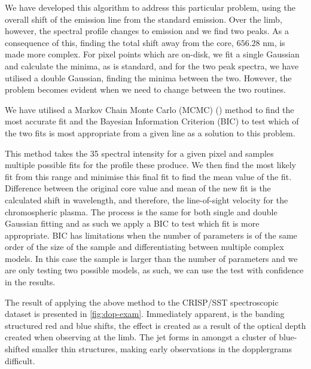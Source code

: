 We have developed this algorithm to address this particular problem, using the overall shift of the emission line from the standard emission. 
Over the limb, however, the spectral profile changes to emission and we find two peaks.
As a consequence of this, finding the total shift away from the core, $656.28$ nm, is made more complex.
For pixel points which are on-disk, we fit a single Gaussian and calculate the minima, as is standard, and for the two peak spectra, we have utilised a double Gaussian, finding the minima between the two.
However, the problem becomes evident when we need to change between the two routines.

We have utilised a Markov Chain Monte Carlo (MCMC) (\cite{Richey2010}) method to find the most accurate fit and the Bayesian Information Criterion (BIC) to test which of the two fits is most appropriate from a given line as a solution to this problem.

This method takes the 35 spectral intensity for a given pixel and samples multiple possible fits for the profile these produce.
We then find the most likely fit from this range and minimise this final fit to find the mean value of the fit.
Difference between the original core value and mean of the new fit is the calculated shift in wavelength, and therefore, the line-of-sight velocity for the chromospheric plasma.
The process is the same for both single and double Gaussian fitting and as such we apply a BIC to test which fit is more appropriate.
BIC has limitations when the number of parameters is of the same order of the size of the sample and differentiating between multiple complex models.
In this case the sample is larger than the number of parameters and we are only testing two possible models, as such, we can use the test with confidence in the results.

The result of applying the above method to the CRISP/SST spectroscopic dataset is presented in \cref{fig:dop-exam}.
Immediately apparent, is the banding structured red and blue shifts, the effect is created as a result of the optical depth created when observing at the limb. 
The jet forms in amongst a cluster of blue-shifted smaller thin structures, making early observations in the dopplergrams difficult.  


